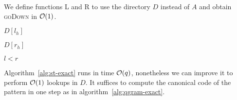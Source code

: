 We define functions \textsc{L} and \textsc{R} to use the directory $D$ instead of $A$ and obtain \textsc{goDown} in $\mathcal{O}(1)$.
\begin{algorithm}[h!]
\begin{minipage}[t]{.5\textwidth}
\label{alg:qgram-lower}
\begin{algorithmic}[1]
	\State \Return $D[l_h]$
\EndProcedure
\end{algorithmic}
\end{minipage}
\hfill
\begin{minipage}[t]{.5\textwidth}
\label{alg:qgram-upper}
\begin{algorithmic}[1]
	\State \Return $D[r_h]$
\EndProcedure
\end{algorithmic}
\end{minipage}
\end{algorithm}

\begin{algorithm}[h!]
\begin{minipage}[t]{.5\textwidth}
\label{alg:qgram-goroot}
\begin{algorithmic}[1]
\EndProcedure
\end{algorithmic}
\end{minipage}
\begin{minipage}[t]{.5\textwidth}
\label{alg:qgram-godownc}
\begin{algorithmic}[1]
		\State \Return \False
	\EndIf
	\State \Return $l < r$
\EndProcedure
\end{algorithmic}
\end{minipage}
\end{algorithm}

Algorithm~\ref{alg:st-exact} runs in time $\mathcal{O}(q)$, nonetheless we can improve it to perform $\mathcal{O}(1)$ lookups in $D$.
It suffices to compute the canonical code of the pattern in one step as in algorithm~\ref{alg:qgram-exact}.

